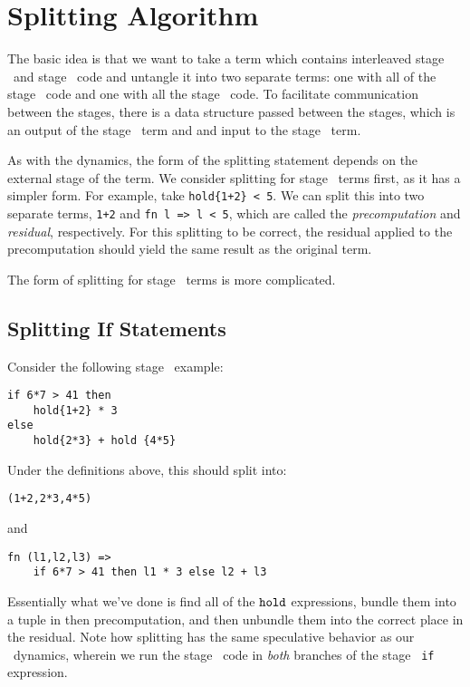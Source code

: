 
\section{Splitting Algorithm}

The basic idea is that we want to take a term which contains interleaved stage \bbone\ and stage \bbtwo\ code
and untangle it into two separate terms: one with all of the stage \bbone\ code and one with all the stage \bbtwo\ code.
To facilitate communication between the stages, there is a data structure passed between the stages, 
which is an output of the stage \bbone\ term and and input to the stage \bbtwo\ term.

As with the dynamics, the form of the splitting statement depends on the external stage of the term.
We consider splitting for stage \bbtwo\ terms first, as it has a simpler form.  
For example, take \verb|hold{1+2} < 5|.
We can split this into two separate terms, \verb|1+2| and \verb|fn l => l < 5|, 
which are called the {\em precomputation} and {\em residual}, respectively.  
For this splitting to be correct, the residual applied to the precomputation should yield the same result as the original term.  

The form of splitting for stage \bbone\ terms is more complicated.

\subsection {Splitting If Statements}

Consider the following stage \bbtwo\ example:
\begin{lstlisting}
if 6*7 > 41 then
	hold{1+2} * 3
else 
	hold{2*3} + hold {4*5}
\end{lstlisting}
Under the definitions above, this should split into:
\begin{lstlisting}
(1+2,2*3,4*5)
\end{lstlisting}
and
\begin{lstlisting}
fn (l1,l2,l3) => 
    if 6*7 > 41 then l1 * 3 else l2 + l3
\end{lstlisting}
Essentially what we've done is find all of the ${\tt hold}$ expressions, 
bundle them into a tuple in then precomputation, 
and then unbundle them into the correct place in the residual.
Note how splitting has the same speculative behavior as our \lang\ dynamics,
wherein we run the stage \bbone\ code in {\em both} branches of the stage \bbtwo\ {\tt if} expression.

